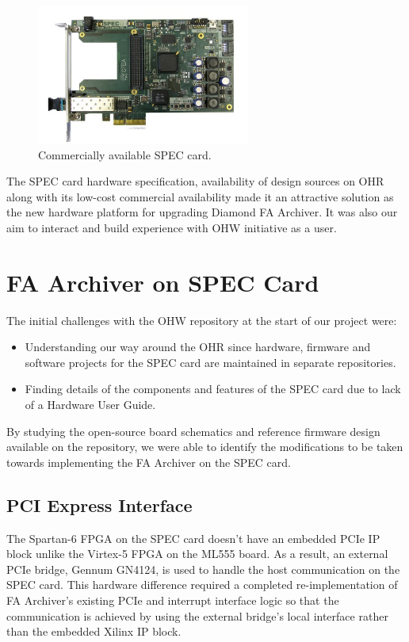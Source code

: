 \documentclass[a4paper,
              ]{jacow}
\begin{document}
\begin{figure}[t!]
   \centering
   \includegraphics[width=70mm]{img/WEPGF089f5}
   \caption{Commercially available SPEC card.}
   \label{SPEC}
\end{figure}

The SPEC card hardware specification, availability of design sources on OHR along with its low-cost commercial availability made it an attractive solution as the new hardware platform for upgrading Diamond FA Archiver. It was also our aim to interact and build experience with OHW initiative as a user.

\section{FA Archiver on SPEC Card}

The initial challenges with the OHW repository at the start of our project were:

\begin{itemize}
\setlength\itemsep{0em}
\item Understanding our way around the OHR since hardware, firmware and software projects for the SPEC card are maintained in separate repositories.
\item Finding details of the components and features of the SPEC card due to lack of a Hardware User Guide.
\end{itemize}

By studying the open-source board schematics and reference firmware design available on the repository, we were able to identify the modifications to be taken towards implementing the FA Archiver on the SPEC card.

\subsection{PCI Express Interface}
The Spartan-6 FPGA on the SPEC card doesn't have an embedded PCIe IP block unlike the Virtex-5 FPGA on the ML555 board. As a result, an external PCIe bridge, Gennum GN4124, is used to handle the host communication on the SPEC card. This hardware difference required a completed re-implementation of FA Archiver's existing PCIe and interrupt interface logic so that the communication is achieved by using the external bridge's local interface rather than the embedded Xilinx IP block.
\end{document}
